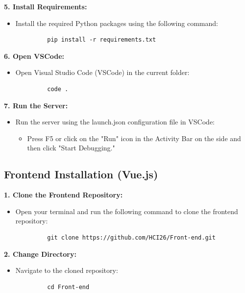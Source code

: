 \documentclass[a4 paper, 12pt]{article}
\begin{document}
\textbf{5. Install Requirements:}
   \begin{itemize}
      \item Install the required Python packages using the following command:
         \begin{verbatim}
         pip install -r requirements.txt
         \end{verbatim}
   \end{itemize}

\textbf{6. Open VSCode:}
   \begin{itemize}
      \item Open Visual Studio Code (VSCode) in the current folder:
         \begin{verbatim}
         code .
         \end{verbatim}
   \end{itemize}

\textbf{7. Run the Server:}
   \begin{itemize}
      \item Run the server using the launch.json configuration file in VSCode:
         \begin{itemize}
            \item Press F5 or click on the "Run" icon in the Activity Bar on the side and then click "Start Debugging."
         \end{itemize}
   \end{itemize}

\subsection{Frontend Installation (Vue.js)}

\textbf{1. Clone the Frontend Repository:}
   \begin{itemize}
      \item Open your terminal and run the following command to clone the frontend repository:
         \begin{verbatim}
         git clone https://github.com/HCI26/Front-end.git
         \end{verbatim}
   \end{itemize}

\textbf{2. Change Directory:}
   \begin{itemize}
      \item Navigate to the cloned repository:
         \begin{verbatim}
         cd Front-end
         \end{verbatim}
   \end{itemize}
\end{document}
